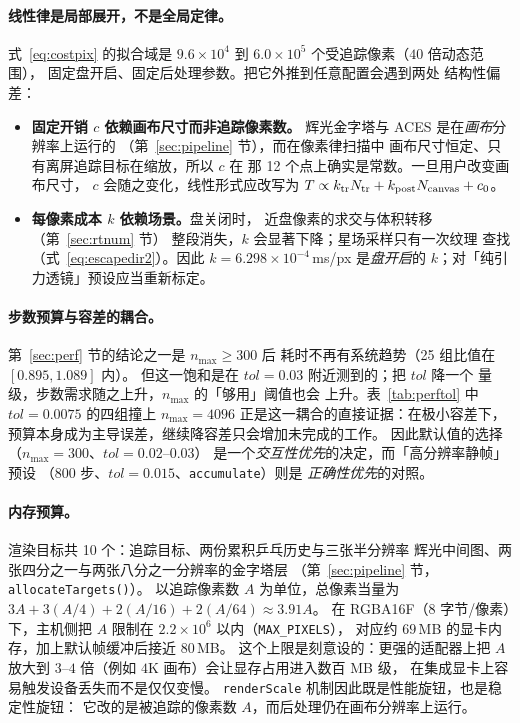 \paragraph{线性律是局部展开，不是全局定律。}
式~\eqref{eq:costpix} 的拟合域是 $9.6\times10^4$ 到
$6.0\times10^5$ 个受追踪像素（$40$ 倍动态范围），
固定盘开启、固定后处理参数。把它外推到任意配置会遇到两处
结构性偏差：

\begin{itemize}[leftmargin=1.6em,itemsep=1pt,topsep=3pt]
  \item \textbf{固定开销 $c$ 依赖画布尺寸而非追踪像素数。}
        辉光金字塔与 ACES 是在\emph{画布}分辨率上运行的
        （第~\ref{sec:pipeline} 节），而在像素律扫描中
        画布尺寸恒定、只有离屏追踪目标在缩放，所以 $c$ 在
        那 12 个点上确实是常数。一旦用户改变画布尺寸，
        $c$ 会随之变化，线性形式应改写为
        $T\propto k_{\rm tr}N_{\rm tr}+k_{\rm post}N_{\rm canvas}+c_0$。
  \item \textbf{每像素成本 $k$ 依赖场景。}盘关闭时，
        近盘像素的求交与体积转移（第~\ref{sec:rtnum} 节）
        整段消失，$k$ 会显著下降；星场采样只有一次纹理
        查找（式~\eqref{eq:escapedir2}）。因此
        $k=6.298\times10^{-4}$\,ms/px 是\emph{盘开启}的
        $k$；对「纯引力透镜」预设应当重新标定。
\end{itemize}

\paragraph{步数预算与容差的耦合。}
第~\ref{sec:perf} 节的结论之一是 $n_{\max}\geq300$ 后
耗时不再有系统趋势（25 组比值在 $[0.895,1.089]$ 内）。
但这一饱和是在 $tol=0.03$ 附近测到的；把 $tol$ 降一个
量级，步数需求随之上升，$n_{\max}$ 的「够用」阈值也会
上升。表~\ref{tab:perftol} 中 $tol=0.0075$ 的四组撞上
$n_{\max}=4096$ 正是这一耦合的直接证据：在极小容差下，
预算本身成为主导误差，继续降容差只会增加未完成的工作。
因此默认值的选择（$n_{\max}=300$、$tol=0.02$--$0.03$）
是一个\emph{交互性优先}的决定，而「高分辨率静帧」预设
（$800$ 步、$tol=0.015$、\texttt{accumulate}）则是
\emph{正确性优先}的对照。

\paragraph{内存预算。}
渲染目标共 10 个：追踪目标、两份累积乒乓历史与三张半分辨率
辉光中间图、两张四分之一与两张八分之一分辨率的金字塔层
（第~\ref{sec:pipeline} 节，\texttt{allocateTargets()}）。
以追踪像素数 $A$ 为单位，总像素当量为
$3A+3(A/4)+2(A/16)+2(A/64)\approx3.91A$。
在 RGBA16F（$8$ 字节/像素）下，主机侧把
$A$ 限制在 $2.2\times10^6$ 以内（\texttt{MAX\_PIXELS}），
对应约 $69$\,MB 的显卡内存，加上默认帧缓冲后接近 $80$\,MB。
这个上限是刻意设的：更强的适配器上把 $A$ 放大到
$3$--$4$ 倍（例如 $4$K 画布）会让显存占用进入数百 MB 级，
在集成显卡上容易触发设备丢失而不是仅仅变慢。
\texttt{renderScale} 机制因此既是性能旋钮，也是稳定性旋钮：
它改的是被追踪的像素数 $A$，而后处理仍在画布分辨率上运行。

